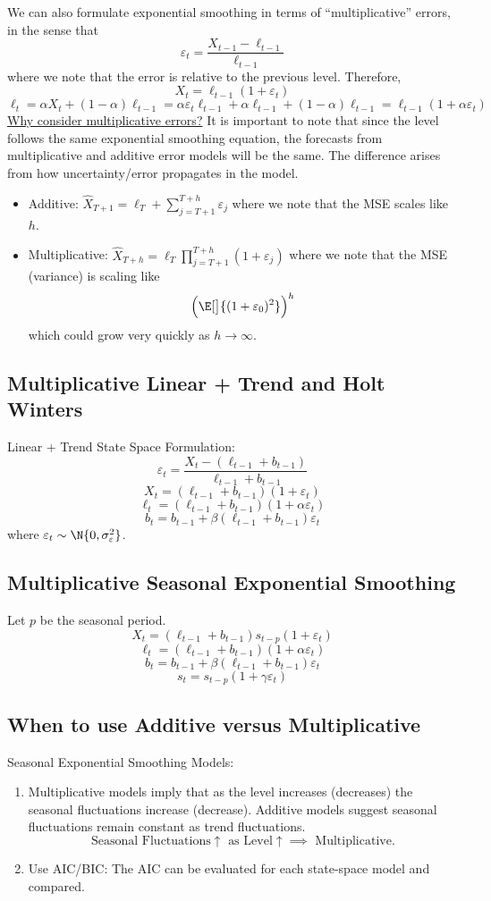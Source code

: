 We can also formulate exponential smoothing in terms of ``multiplicative''
errors, in the sense that
\[ \varepsilon_t=\frac{X_{t-1}-\ell_{t-1}}{\ell_{t-1}}  \]
where we note that the error is relative to the previous level. Therefore,
\[ X_t=\ell_{t-1}(1+\varepsilon_t) \]
\[ \ell_t=\alpha X_t+(1-\alpha)\ell_{t-1} =\alpha\varepsilon_t\ell_{t-1}+\alpha\ell_{t-1}+(1-\alpha)\ell_{t-1}
      =\ell_{t-1}(1+\alpha\varepsilon_t) \]
\underline{Why consider multiplicative errors?} It is important
to note that since the level follows the same exponential smoothing equation,
the forecasts from multiplicative and additive error models will be the same.
The difference arises from how uncertainty/error propagates in the model.
\begin{itemize}
      \item Additive: $ \hat{X}_{T+1}=\ell_T+\sum_{j=T+1}^{T+h} \varepsilon_j $
            where we note that the MSE scales like $ h $.
      \item Multiplicative: $ \hat{X}_{T+h}=\ell_T \prod_{j=T+1}^{T+h}(1+\varepsilon_j) $
            where we note that the MSE (variance) is scaling like
            \[ \Bigl(\E[\big]{(1+\varepsilon_0)^2}\Bigr)^h \]
            which could grow very quickly as $ h\to\infty $.
\end{itemize}
\subsection*{Multiplicative Linear + Trend and Holt Winters}
Linear + Trend State Space Formulation:
\[ \varepsilon_t=\frac{X_t-(\ell_{t-1}+b_{t-1})}{\ell_{t-1}+b_{t-1}}  \]
\[ X_t=(\ell_{t-1}+b_{t-1})(1+\varepsilon_t) \]
\[ \ell_t=(\ell_{t-1}+b_{t-1})(1+\alpha\varepsilon_t) \]
\[ b_t=b_{t-1}+\beta(\ell_{t-1}+b_{t-1})\varepsilon_t \]
where $ \varepsilon_t \sim \N{0,\sigma_{\varepsilon}^2} $.
\subsection*{Multiplicative Seasonal Exponential Smoothing}
Let $ p $ be the seasonal period.
\[ X_t=(\ell_{t-1}+b_{t-1})s_{t-p}(1+\varepsilon_t) \]
\[ \ell_t=(\ell_{t-1}+b_{t-1})(1+\alpha\varepsilon_t) \]
\[ b_t=b_{t-1}+\beta(\ell_{t-1}+b_{t-1})\varepsilon_t \]
\[ s_t=s_{t-p}(1+\gamma\varepsilon_t) \]
\subsection*{When to use Additive versus Multiplicative}
Seasonal Exponential Smoothing Models:
\begin{enumerate}[(1)]
      \item Multiplicative models imply that as the level increases (decreases)
            the seasonal fluctuations increase (decrease). Additive models suggest
            seasonal fluctuations remain constant as trend fluctuations.
            \[ \text{Seasonal Fluctuations}\uparrow\text{ as }\text{Level}\uparrow\implies
                  \text{ Multiplicative}. \]
      \item Use AIC/BIC\@: The AIC can be evaluated for each state-space
            model and compared.
\end{enumerate}
